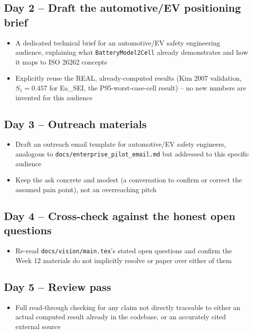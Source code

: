 \documentclass[11pt]{article}
\begin{document}
\subsection*{Day 2 -- Draft the automotive/EV positioning brief}
\begin{itemize}[leftmargin=*]
  \item A dedicated technical brief for an automotive/EV safety
    engineering audience, explaining what \texttt{BatteryModel2Cell}
    already demonstrates and how it maps to ISO 26262 concepts
  \item Explicitly reuse the REAL, already-computed results (Kim 2007
    validation, $S_1=0.457$ for Ea\_SEI, the P95-worst-case-cell
    result) -- no new numbers are invented for this audience
\end{itemize}

\subsection*{Day 3 -- Outreach materials}
\begin{itemize}[leftmargin=*]
  \item Draft an outreach email template for automotive/EV safety
    engineers, analogous to \texttt{docs/enterprise\_pilot\_email.md}
    but addressed to this specific audience
  \item Keep the ask concrete and modest (a conversation to confirm
    or correct the assumed pain point), not an overreaching pitch
\end{itemize}

\subsection*{Day 4 -- Cross-check against the honest open questions}
\begin{itemize}[leftmargin=*]
  \item Re-read \texttt{docs/vision/main.tex}'s stated open questions
    and confirm the Week 12 materials do not implicitly resolve or
    paper over either of them
\end{itemize}

\subsection*{Day 5 -- Review pass}
\begin{itemize}[leftmargin=*]
  \item Full read-through checking for any claim not directly
    traceable to either an actual computed result already in the
    codebase, or an accurately cited external source
\end{itemize}
\end{document}
